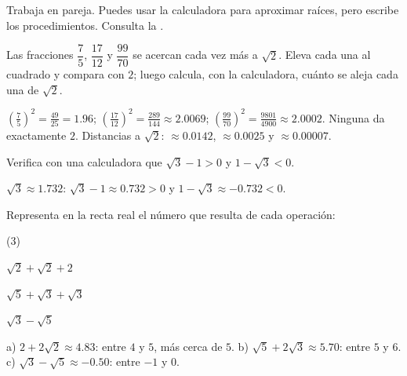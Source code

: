 \documentclass[11pt]{article}
\begin{document}
\encabezado

\begin{instrucciones}
Trabaja en pareja. Puedes usar la calculadora para aproximar raíces, pero escribe los
procedimientos. Consulta la .
\end{instrucciones}

\begin{preguntas}

\pregunta[1.5] Las fracciones $\dfrac{7}{5}$, $\dfrac{17}{12}$ y $\dfrac{99}{70}$ se acercan
cada vez más a $\sqrt{2}$. Eleva cada una al cuadrado y compara con $2$; luego calcula, con la
calculadora, cuánto se aleja cada una de $\sqrt{2}$.
\begin{solucion}[2.8cm]
$\left(\frac{7}{5}\right)^2 = \frac{49}{25} = \num{1,96}$;
$\left(\frac{17}{12}\right)^2 = \frac{289}{144} \approx \num{2,0069}$;
$\left(\frac{99}{70}\right)^2 = \frac{9801}{4900} \approx \num{2,0002}$. Ninguna da
exactamente $2$. Distancias a $\sqrt{2}$: $\approx \num{0,0142}$, $\approx \num{0,0025}$ y
$\approx \num{0,00007}$.
\end{solucion}

\pregunta[1] Verifica con una calculadora que $\sqrt{3} - 1 > 0$ y $1 - \sqrt{3} < 0$.
\begin{solucion}[1.6cm]
$\sqrt{3} \approx \num{1,732}$: $\sqrt{3} - 1 \approx \num{0,732} > 0$ y
$1 - \sqrt{3} \approx -\num{0,732} < 0$.
\end{solucion}

\pregunta[1.5] Representa en la recta real el número que resulta de cada operación:
\begin{opciones*}(3)
  \item $\sqrt{2} + \sqrt{2} + 2$
  \item $\sqrt{5} + \sqrt{3} + \sqrt{3}$
  \item $\sqrt{3} - \sqrt{5}$
\end{opciones*}
\begin{center}
\end{center}
\begin{solucion}[1.8cm]
a) $2 + 2\sqrt{2} \approx \num{4,83}$: entre $4$ y $5$, más cerca de $5$.
b) $\sqrt{5} + 2\sqrt{3} \approx \num{5,70}$: entre $5$ y $6$.
c) $\sqrt{3} - \sqrt{5} \approx -\num{0,50}$: entre $-1$ y $0$.
\end{solucion}


\end{preguntas}
\end{document}
